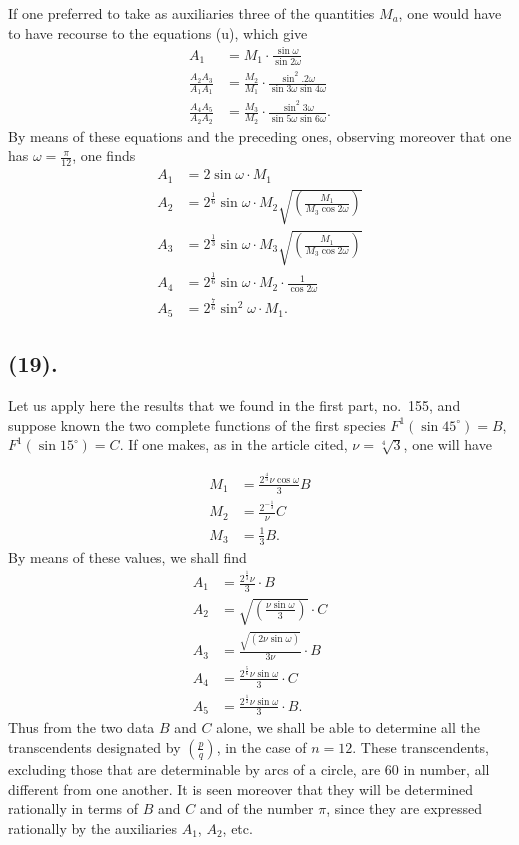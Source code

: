 \documentclass{article}
\begin{document}
If one preferred to take as auxiliaries three of the quantities $M_{a}$, one would have to have recourse to the equations (u), which give
\[ \begin{aligned} A_{1}&=M_{1}\cdot\frac{\sin\omega}{\sin 2\omega}\\ \frac{A_{2}A_{3}}{A_{1}A_{1}}&=\frac{M_{2}}{M_{1}}\cdot\frac{\sin^{2}.2\omega}{\sin 3\omega\sin 4\omega}\\ \frac{A_{4}A_{5}}{A_{2}A_{2}}&=\frac{M_{3}}{M_{2}}\cdot\frac{\sin^{2}3\omega}{\sin 5\omega\sin 6\omega}. \end{aligned} \]
By means of these equations and the preceding ones, observing moreover that one has $\omega=\frac{\pi}{12}$, one finds
\[ \begin{aligned} A_{1}&=2\sin\omega\cdot M_{1}\\ A_{2}&=2^{\frac{1}{6}}\sin\omega\cdot M_{2}\sqrt{\left(\frac{M_{1}}{M_{3}\cos 2\omega}\right)}\\ A_{3}&=2^{\frac{1}{3}}\sin\omega\cdot M_{3}\sqrt{\left(\frac{M_{1}}{M_{3}\cos 2\omega}\right)}\\ A_{4}&=2^{\frac{1}{6}}\sin\omega\cdot M_{2}\cdot\frac{1}{\cos 2\omega}\\ A_{5}&=2^{\frac{7}{6}}\sin^{2}\omega\cdot M_{1}. \end{aligned} \]

\subsection*{(19).}

Let us apply here the results that we found in the first part, no.~155, and suppose known the two complete functions of the first species $F^{1}(\sin 45^{\circ})=B$, $F^{1}(\sin 15^{\circ})=C$. If one makes, as in the article cited, $\nu=\sqrt[4]{3}$, one will have

\[ \begin{aligned} M_{1}&=\frac{2^{\frac{4}{3}}\nu\cos\omega}{3}B\\ M_{2}&=\frac{2^{-\frac{1}{3}}}{\nu}C\\ M_{3}&=\tfrac{1}{3}B. \end{aligned} \]
By means of these values, we shall find
\[ \begin{aligned} A_{1}&=\frac{2^{\frac{1}{3}}\nu}{3}\cdot B\\ A_{2}&=\sqrt{\left(\frac{\nu\sin\omega}{3}\right)}\cdot C\\ A_{3}&=\frac{\sqrt{(2\nu\sin\omega)}}{3\nu}\cdot B\\ A_{4}&=\frac{2^{\frac{5}{6}}\nu\sin\omega}{3}\cdot C\\ A_{5}&=\frac{2^{\frac{1}{2}}\nu\sin\omega}{3}\cdot B. \end{aligned} \]
Thus from the two data $B$ and $C$ alone, we shall be able to determine all the transcendents designated by $\left(\frac{p}{q}\right)$, in the case of $n=12$. These transcendents, excluding those that are determinable by arcs of a circle, are 60 in number, all different from one another. It is seen moreover that they will be determined rationally in terms of $B$ and $C$ and of the number $\pi$, since they are expressed rationally by the auxiliaries $A_{1}$, $A_{2}$, etc.
\end{document}

